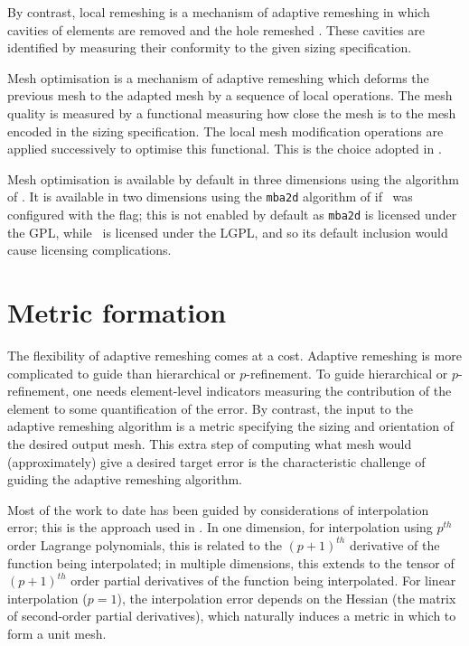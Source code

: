 By contrast, local remeshing is a mechanism of adaptive remeshing in which cavities of elements are removed
and the hole remeshed \citep{hassan1998}. These cavities are identified by measuring
their conformity to the given sizing specification.

Mesh optimisation is a mechanism of adaptive remeshing which deforms the previous mesh
to the adapted mesh by a sequence of local operations.
The mesh quality is measured by a functional measuring how close the mesh is to
the mesh encoded in the sizing specification. The local mesh modification
operations are applied successively to optimise this functional. This is the choice
adopted in \fluidity.

Mesh optimisation is available by default in three dimensions using the algorithm
of \citet{pain2001}. It is available in two dimensions using the \texttt{mba2d} algorithm of
\citet{vasilevskii1999} if \fluidity\ was configured with
the  flag; this is not enabled by default
as \texttt{mba2d} is licensed under the GPL, while \fluidity\ is licensed under the LGPL,
and so its default inclusion would cause licensing complications.

\section{Metric formation} \label{sec:metric_formation}
The flexibility of adaptive remeshing comes at a cost.
Adaptive remeshing is more complicated to guide than hierarchical or $p$-refinement. 
To guide hierarchical or $p$-refinement, one needs element-level indicators
measuring the contribution of the element to some quantification of
the error. By contrast, the input to the adaptive remeshing algorithm
is a metric specifying the sizing and orientation of the desired output
mesh. This extra step of computing what mesh would (approximately)
give a desired target error is the characteristic challenge of guiding
the adaptive remeshing algorithm.

Most of the work to date has been guided by considerations of
interpolation error; this is the approach used in \fluidity. In one dimension, for interpolation
using $p^{th}$ order Lagrange polynomials, this is related to the
$(p+1)^{th}$ derivative of the function being interpolated; in multiple
dimensions, this extends to the tensor of $(p+1)^{th}$ order partial
derivatives of the function being interpolated. For linear interpolation
($p=1$), the interpolation error depends on the Hessian (the matrix
of second-order partial derivatives), which naturally induces
a metric in which to form a unit mesh. 

